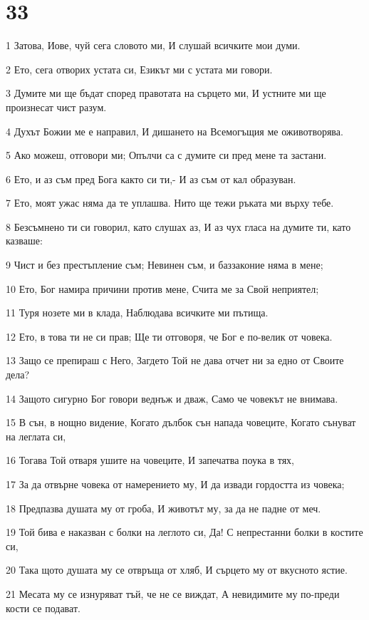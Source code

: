 \chapter{33}

\par 1 Затова, Иове, чуй сега словото ми, И слушай всичките мои думи.
\par 2 Ето, сега отворих устата си, Езикът ми с устата ми говори.
\par 3 Думите ми ще бъдат според правотата на сърцето ми, И устните ми ще произнесат чист разум.
\par 4 Духът Божии ме е направил, И дишането на Всемогъщия ме оживотворява.
\par 5 Ако можеш, отговори ми; Опълчи са с думите си пред мене та застани.
\par 6 Ето, и аз съм пред Бога както си ти,- И аз съм от кал образуван.
\par 7 Ето, моят ужас няма да те уплашва. Нито ще тежи ръката ми върху тебе.
\par 8 Безсъмнено ти си говорил, като слушах аз, И аз чух гласа на думите ти, като казваше:
\par 9 Чист и без престъпление съм; Невинен съм, и баззаконие няма в мене;
\par 10 Ето, Бог намира причини против мене, Счита ме за Свой неприятел;
\par 11 Туря нозете ми в клада, Наблюдава всичките ми пътища.
\par 12 Ето, в това ти не си прав; Ще ти отговоря, че Бог е по-велик от човека.
\par 13 Защо се препираш с Него, Загдето Той не дава отчет ни за едно от Своите дела?
\par 14 Защото сигурно Бог говори веднъж и дваж, Само че човекът не внимава.
\par 15 В сън, в нощно видение, Когато дълбок сън напада човеците, Когато сънуват на леглата си,
\par 16 Тогава Той отваря ушите на човеците, И запечатва поука в тях,
\par 17 За да отвърне човека от намерението му, И да извади гордостта из човека;
\par 18 Предпазва душата му от гроба, И животът му, за да не падне от меч.
\par 19 Той бива е наказван с болки на леглото си, Да! С непрестанни болки в костите си,
\par 20 Така щото душата му се отвръща от хляб, И сърцето му от вкусното ястие.
\par 21 Месата му се изнуряват тъй, че не се виждат, А невидимите му по-преди кости се подават.
